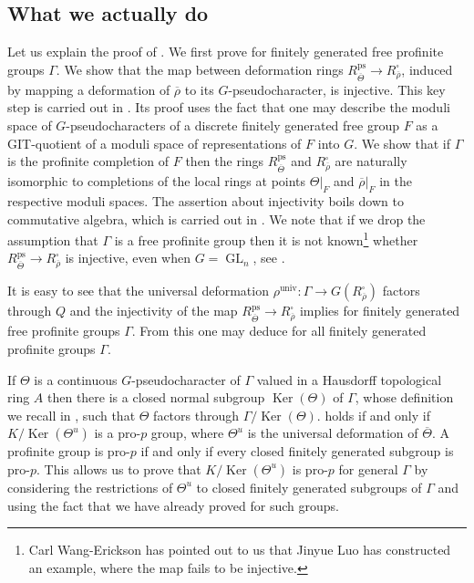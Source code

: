 \documentclass{amsart}
\theoremstyle{definition}
\theoremstyle{remark}
\DeclareMathOperator{\GL}{GL}
\DeclareMathOperator{\Ker}{Ker}
\newcommand{\rhobar}{\overline{\rho}}
\newcommand{\univ}{\mathrm{univ}}
\newcommand{\Thetabar}{\overline{\Theta}}
\newcommand{\ps}{\mathrm{ps}}
\begin{document}
\subsection{What we actually do}
Let us explain the proof of . We first prove  for finitely generated free profinite groups $\Gamma$. We show that the map between 
deformation rings $R^{\ps}_{\Thetabar} \rightarrow R^{\square}_{\rhobar}$, 
induced by mapping a deformation of $\rhobar$ to its $G$-pseudocharacter, is 
injective. This  key step is carried out in  . Its proof uses the fact that one may describe 
the moduli space of $G$-pseudocharacters of a discrete finitely generated free group $F$ as a GIT-quotient of a moduli space of representations of $F$ into $G$. We show that if $\Gamma$ is the profinite completion of $F$ then the rings $R^{\ps}_{\Thetabar}$ and $R^{\square}_{\rhobar}$
are naturally isomorphic to completions of the local rings at points $\Theta|_F$ and $\rhobar|_F$ in the 
respective moduli spaces. The assertion about injectivity boils down to commutative algebra, which is carried out in .  We note that if we drop the 
assumption that $\Gamma$ is a  free profinite group then 
it is not known\footnote{Carl Wang-Erickson has pointed out to us that Jinyue Luo 
\cite{jinyue} has constructed an example, where the map fails to be  injective.} whether $R^{\ps}_{\Thetabar}\rightarrow R^{\square}_{\rhobar}$ is injective, even when $G=\GL_n$, see \cite[Remark 1.25]{che_durham}.  

It is easy to see that the universal deformation 
$\rho^{\univ}: \Gamma\rightarrow G(R^{\square}_{\rhobar})$ factors through $Q$ 
and the injectivity of the map $R^{\ps}_{\Thetabar} \rightarrow R^{\square}_{\rhobar}$ implies  for finitely generated  
free profinite groups $\Gamma$. From this one may deduce  
for all finitely generated profinite groups $\Gamma$. 

If $\Theta$ is a continuous $G$-pseudocharacter of $\Gamma$ valued in a Hausdorff
topological ring $A$ then there is a closed normal subgroup $\Ker(\Theta)$ of $\Gamma$, whose definition we recall in , such that $\Theta$ factors through $\Gamma/\Ker(\Theta)$.  holds if and only if $K/\Ker(\Theta^u)$ is a pro-$p$ group, where $\Theta^u$ is the universal deformation of $\Thetabar$. A profinite group is pro-$p$ if and only if 
every closed finitely generated subgroup is pro-$p$. This allows us to prove 
that $K/\Ker(\Theta^u)$ is pro-$p$ for general $\Gamma$ by considering the restrictions of $\Theta^u$ to closed finitely generated 
subgroups of $\Gamma$ and using the fact that we have already proved  
for such groups. 
\end{document}
